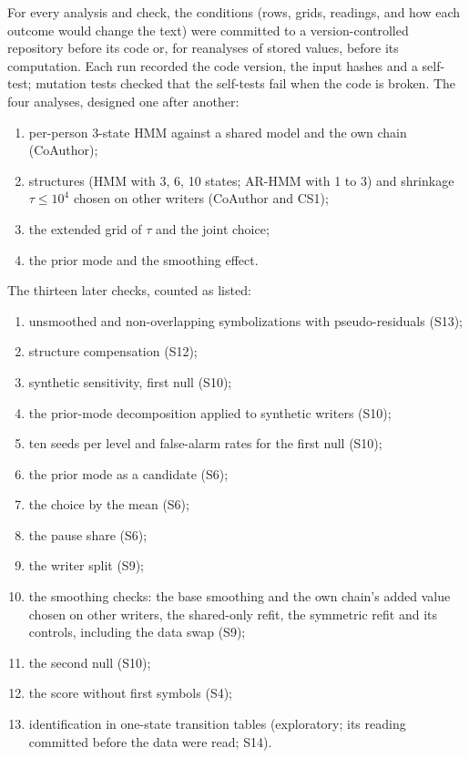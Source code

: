 \documentclass[10pt]{article}
\newcommand{\hmmthree}{\mbox{3-state} HMM}
\begin{document}
For every analysis and check, the conditions (rows, grids, readings, and how each outcome would change the text) were committed to a version-controlled repository before its code or, for reanalyses of stored values, before its computation. Each run recorded the code version, the input hashes and a self-test; mutation tests checked that the self-tests fail when the code is broken. The four analyses, designed one after another:
\begin{enumerate}
\item per-person \hmmthree{} against a shared model and the own chain (CoAuthor);
\item structures (HMM with 3, 6, 10 states; AR-HMM with 1 to 3) and shrinkage $\tau\le10^4$ chosen on other writers (CoAuthor and CS1);
\item the extended grid of $\tau$ and the joint choice;
\item the prior mode and the smoothing effect.
\end{enumerate}
The thirteen later checks, counted as listed:
\begin{enumerate}
\item unsmoothed and non-overlapping symbolizations with pseudo-residuals (S13);
\item structure compensation (S12);
\item synthetic sensitivity, first null (S10);
\item the prior-mode decomposition applied to synthetic writers (S10);
\item ten seeds per level and false-alarm rates for the first null (S10);
\item the prior mode as a candidate (S6);
\item the choice by the mean (S6);
\item the pause share (S6);
\item the writer split (S9);
\item the smoothing checks: the base smoothing and the own chain's added value chosen on other writers, the shared-only refit, the symmetric refit and its controls, including the data swap (S9);
\item the second null (S10);
\item the score without first symbols (S4);
\item identification in one-state transition tables (exploratory; its reading committed before the data were read; S14).
\end{enumerate}
\end{document}
